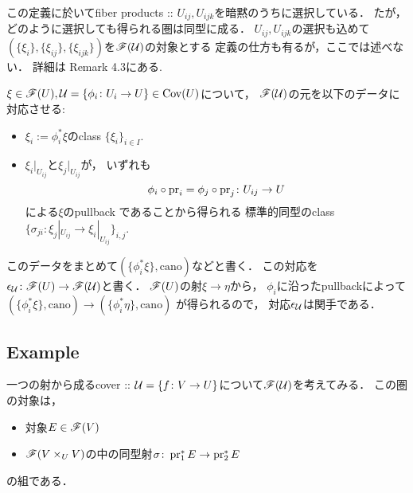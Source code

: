 \documentclass[a4paper]{jsarticle}
\begin{document}
\begin{Remark}
    この定義に於いてfiber products :: $U_{ij}, U_{ijk}$を暗黙のうちに選択している．
    たが，どのように選択しても得られる圏は同型に成る．
    $U_{ij}, U_{ijk}$の選択も込めて
    $(\{\xi_i\}, \{\xi_{ij}\}, \{\xi_{ijk}\})$を$\mathscr{F}(\mathcal{U})$の対象とする
    定義の仕方も有るが，ここでは述べない．
    詳細は\cite{NoteGroTop} Remark 4.3にある.
\end{Remark}

\begin{Def} \label{def:epsilon}
    $\xi \in \mathscr{F}(U), \mathcal{U}=\{\phi_i \colon U_i \to U\} \in \operatorname{Cov}(U)$について，
    $\mathscr{F}(\mathcal{U})$の元を以下のデータに対応させる:
    \begin{itemize}
        \item $\xi_i:=\phi_i^*\xi$のclass $\{\xi_i\}_{i \in I}$.
        \item
            $\xi_i|_{U_{ij}}$と$\xi_j|_{U_{ij}}$が，
            いずれも
            \[ \phi_i \circ \operatorname{pr}_i=\phi_j \circ \operatorname{pr}_j \colon U_{ij} \to U \]による$\xi$のpullback
            であることから得られる
            標準的同型のclass $\{ \sigma_{ji} \colon \xi_j|_{U_{ij}} \to \xi_i|_{U_{ij}} \}_{i,j}$.
    \end{itemize}
    このデータをまとめて$(\{\phi_i^*\xi\}, \mathrm{cano})$などと書く．
    この対応を$\epsilon_{\mathcal{U}} \colon \mathscr{F}(U) \to \mathscr{F}(\mathcal{U})$と書く．
    $\mathscr{F}(U)$の射$\xi \to \eta$から，
    $\phi_i$に沿ったpullbackによって$(\{\phi_i^*\xi\}, \mathrm{cano}) \to (\{\phi_i^*\eta\}, \mathrm{cano})$
    が得られるので，
    対応$\epsilon_{\mathcal{U}}$は関手である．
\end{Def}

\subsection{Example}
\begin{Example}
    一つの射から成るcover :: $\mathcal{U}=\{f \colon V \to U\}$について$\mathscr{F}(\mathcal{U})$を考えてみる．
    この圏の対象は，
    \begin{itemize}
        \item 対象$E \in \mathscr{F}(V)$
        \item $\mathscr{F}(V \times_U V)$の中の同型射$\sigma \colon \operatorname{pr}_1^*E \to \operatorname{pr}_2^*E$
    \end{itemize}
    の組である．
\end{Example}
\end{document}
